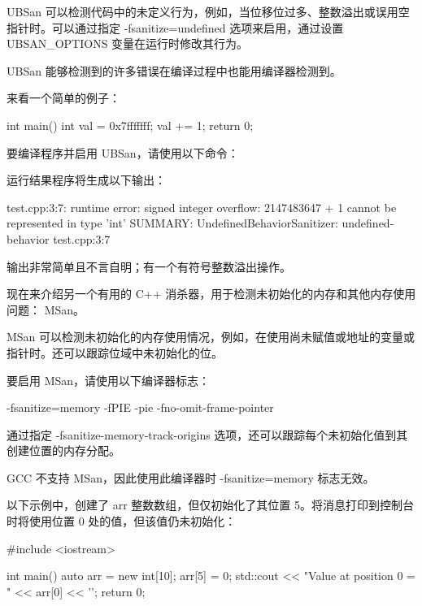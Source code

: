 UBSan 可以检测代码中的未定义行为，例如，当位移位过多、整数溢出或误用空指针时。可以通过指定 -fsanitize=undefined 选项来启用，通过设置 UBSAN\_OPTIONS 变量在运行时修改其行为。

UBSan 能够检测到的许多错误在编译过程中也能用编译器检测到。

来看一个简单的例子：

\begin{cpp}
int main() {
    int val = 0x7fffffff;
    val += 1;
    return 0;
}
\end{cpp}

要编译程序并启用 UBSan，请使用以下命令：


运行结果程序将生成以下输出：

\begin{shell}
test.cpp:3:7: runtime error: signed integer overflow: 2147483647 + 1
cannot be represented in type 'int'
SUMMARY: UndefinedBehaviorSanitizer: undefined-behavior test.cpp:3:7
\end{shell}

输出非常简单且不言自明；有一个有符号整数溢出操作。

现在来介绍另一个有用的 C++ 消杀器，用于检测未初始化的内存和其他内存使用问题： MSan。


MSan 可以检测未初始化的内存使用情况，例如，在使用尚未赋值或地址的变量或指针时。还可以跟踪位域中未初始化的位。

要启用 MSan，请使用以下编译器标志：

\begin{shell}
-fsanitize=memory -fPIE -pie -fno-omit-frame-pointer
\end{shell}

通过指定 -fsanitize-memory-track-origins 选项，还可以跟踪每个未初始化值到其创建位置的内存分配。

GCC 不支持 MSan，因此使用此编译器时 -fsanitize=memory 标志无效。

以下示例中，创建了 arr 整数数组，但仅初始化了其位置 5。将消息打印到控制台时将使用位置 0 处的值，但该值仍未初始化：

\begin{cpp}
#include <iostream>

int main() {
    auto arr = new int[10];
    arr[5] = 0;
    std::cout << "Value at position 0 = " << arr[0] << '\n';
    return 0;
}
\end{cpp}


